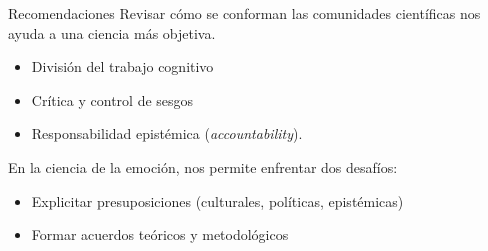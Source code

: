 \documentclass[%
            9pt,
                spanish, %
                    ignorenonframetext,
                    handout, %
                aspectratio=169, %
        ]{beamer}
\providecommand{\tightlist}{}
\begin{document}
\begin{frame}{Recomendaciones}
\label{recomendaciones-2}
Revisar cómo se conforman las comunidades científicas nos ayuda a una
ciencia más objetiva. \pause

\begin{itemize}
\tightlist
\item
  División del trabajo cognitivo \pause
\item
  Crítica y control de sesgos \pause
\item
  Responsabilidad epistémica (\emph{accountability}). \pause
\end{itemize}

En la ciencia de la emoción, nos permite enfrentar dos desafíos: \pause

\begin{itemize}
\tightlist
\item
  Explicitar presuposiciones (culturales, políticas, epistémicas) \pause
\item
  Formar acuerdos teóricos y metodológicos
\end{itemize}
\end{frame}
\end{document}

